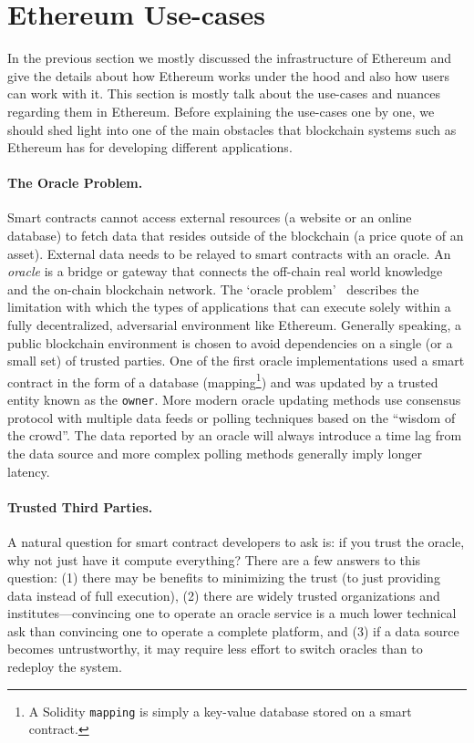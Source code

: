 \section{Ethereum Use-cases}

In the previous section we mostly discussed the infrastructure of Ethereum and give the details about how Ethereum works under the hood and also how users can work with it. 
This section is mostly talk about the use-cases and nuances regarding them in Ethereum. Before explaining the use-cases one by one, we should shed light into one of the main obstacles that blockchain systems such as Ethereum has for developing different applications.


\paragraph{The Oracle Problem.}  

Smart contracts cannot access external resources (\eg a website or an online database) to fetch data that resides outside of the blockchain (\eg a price quote of an asset). External data needs to be relayed to smart contracts with an oracle. An \emph{oracle} is a bridge or gateway that connects the off-chain real world knowledge and the on-chain blockchain network. The `oracle problem'~\cite{linkOracleProblem} describes the limitation with which the types of applications that can execute solely within a fully decentralized, adversarial environment like Ethereum. Generally speaking, a public blockchain environment is chosen to avoid dependencies on a single (or a small set) of trusted parties. One of the first oracle implementations used a smart contract in the form of a database (\ie mapping\footnote{A Solidity \texttt{mapping} is simply a key-value database stored on a smart contract.}) and was updated by a trusted entity known as the \texttt{owner}. More modern oracle updating methods use consensus protocol with multiple data feeds or polling techniques based on the ``wisdom of the crowd''. The data reported by an oracle will always introduce a time lag from the data source and more complex polling methods generally imply longer latency.

\paragraph{Trusted Third Parties.} A natural question for smart contract developers to ask is: if you trust the oracle, why not just have it compute everything? There are a few answers to this question: (1) there may be benefits to minimizing the trust (\ie to just providing data instead of full execution), (2) there are widely trusted organizations and institutes---convincing one to operate an oracle service is a much lower technical ask than convincing one to operate a complete platform, and (3) if a data source becomes untrustworthy, it may require less effort to switch oracles than to redeploy the system. 

